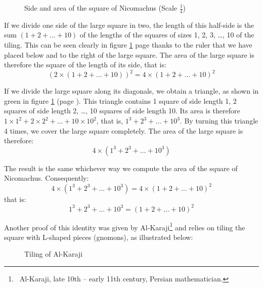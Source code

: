 \begin{corrige}{\hfill

\begin{figure}[htbp]
 \caption{Side and area of the square of Nicomachus (Scale $\frac{1}{4}$)}
 \label{fig:Nicomaque2}
\end{figure}
If we divide one side of the large square in two, the length of this
half-side is the sum $(1 + 2 + \ldots + 10)$ of the lengths of the squares
of sizes 1, 2, 3, \ldots, 10 of the tiling. This can be seen clearly in
figure \ref{fig:Nicomaque2}  page \pageref{fig:Nicomaque2} thanks to the
ruler that we have placed below and to the right of the large square.
The area of the large square is therefore the square of the length of its side, that is:
\[(2 \times (1 + 2 + \ldots + 10))^{2} = 4 \times (1 + 2 + \ldots + 10)^{2}\]

If we divide the large square along its diagonals, we obtain a
triangle, as shown in green in
figure \ref{fig:Nicomaque2} (page \pageref{fig:Nicomaque2}). This triangle
contains 1 square of side length 1, 2 squares of side
length 2, \ldots, 10 squares of side length 10. Its area is
therefore $1 \times 1^{2} + 2 \times 2^{2} + \ldots + 10  \times  10^{2}$, that is,
$1^{3} + 2^{3} + \ldots + 10^{3}$. By turning this triangle 4 times, we
cover the large square completely. The area of the large square is
therefore:
\[4 \times (1^{3} + 2^{3} + \ldots + 10^{3})\]

The result is the same whichever way we compute the area
of the square of Nicomachus. Consequently:
\[4 \times (1^{3} + 2^{3} + \ldots + 10^{3}) = 4 \times (1 + 2 + \ldots + 10)^{2}\]
that is:
\[ 1^{3} + 2^{3} + \ldots + 10^{3} = (1 + 2 + \ldots + 10)^{2}\]

Another proof of this identity was given by Al-Karaji\/\@\footnote{\ Al-Karaji,
late 10th -- early 11th century, Persian mathematician.} and relies on tiling the square with
L-shaped pieces (gnomons), as illustrated below:

\begin{figure}[htbp]
 \caption{Tiling of Al-Karaji}
\end{figure}

}
\end{corrige}
